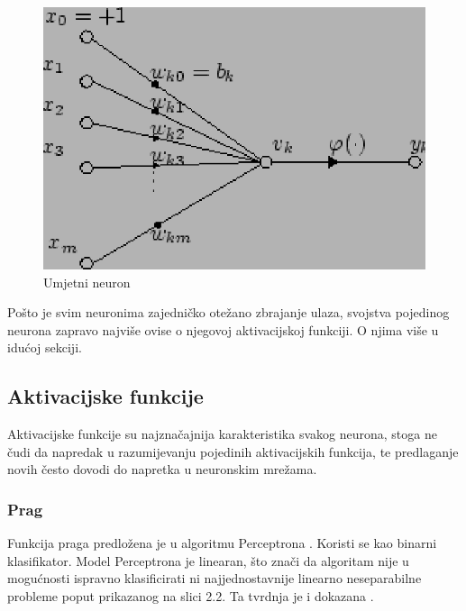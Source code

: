 \documentclass[times, utf8, diplomski]{fer}
\begin{document}
\begin{figure}[!htbp]
    \centering
    \includegraphics[scale=0.8]{Slike/Artificial_neuron}
    \caption{Umjetni neuron \cite{neuron}}
\end{figure}

Pošto je svim neuronima zajedničko otežano zbrajanje ulaza, svojstva pojedinog neurona zapravo najviše ovise o njegovoj aktivacijskoj funkciji. O njima više u idućoj sekciji.

\subsection{Aktivacijske funkcije}
Aktivacijske funkcije su najznačajnija karakteristika svakog neurona, stoga ne čudi da napredak u razumijevanju pojedinih aktivacijskih funkcija, te predlaganje novih često dovodi do napretka u neuronskim mrežama.

\subsubsection{Prag}
Funkcija praga predložena je u algoritmu Perceptrona \cite{perceptron}. Koristi se kao binarni klasifikator. Model Perceptrona je linearan, što znači da algoritam nije u mogućnosti ispravno klasificirati ni najjednostavnije linearno neseparabilne probleme poput prikazanog na slici 2.2. Ta tvrdnja je i dokazana \cite{minsky}.
\end{document}
